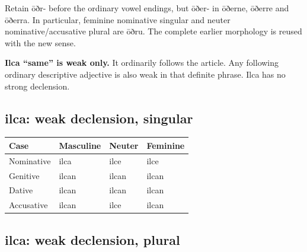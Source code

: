Retain ōðr- before the ordinary vowel endings, but ōðer- in ōðerne, ōðerre and ōðerra. In particular, feminine nominative singular and neuter nominative/\allowbreak{}accusative plural are ōðru. The complete earlier morphology is reused with the new sense.

\textbf{Ilca “same” is weak only.} It ordinarily follows the article. Any following ordinary descriptive adjective is also weak in that definite phrase. Ilca has no strong declension.

\subsection*{ilca: weak declension, singular}

\par\begingroup
\fontsize{10.5}{13.2}\selectfont
\setlength{\LTleft}{0pt}\setlength{\LTright}{\fill}
\noindent
\begin{tabular}{@{}>{\raggedright\arraybackslash}p{28.89mm}>{\raggedright\arraybackslash}p{28.89mm}>{\raggedright\arraybackslash}p{28.89mm}>{\raggedright\arraybackslash}p{28.89mm}@{}}
\toprule
\textbf{Case} & \textbf{Masculine} & \textbf{Neuter} & \textbf{Feminine} \\
\midrule
Nominative & ilca & ilce & ilce \\
Genitive & ilcan & ilcan & ilcan \\
Dative & ilcan & ilcan & ilcan \\
Accusative & ilcan & ilce & ilcan \\
\bottomrule
\end{tabular}
\par\endgroup

\subsection*{ilca: weak declension, plural}

